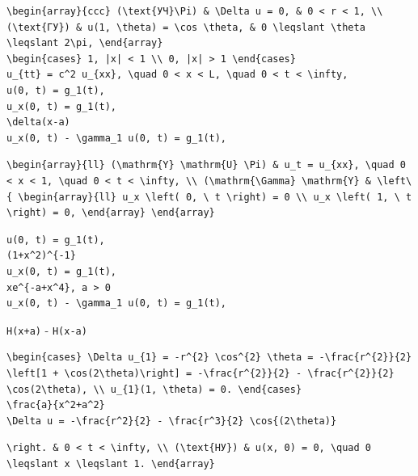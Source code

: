 \documentclass[
  ukrainian,
]{article}
\begin{document}
\begin{verbatim}
\begin{array}{ccc} (\text{УЧ}\Pi) & \Delta u = 0, & 0 < r < 1, \\ (\text{ГУ}) & u(1, \theta) = \cos \theta, & 0 \leqslant \theta \leqslant 2\pi, \end{array}
\begin{cases} 1, |x| < 1 \\ 0, |x| > 1 \end{cases}
u_{tt} = c^2 u_{xx}, \quad 0 < x < L, \quad 0 < t < \infty,
u(0, t) = g_1(t),
u_x(0, t) = g_1(t),
\delta(x-a)
u_x(0, t) - \gamma_1 u(0, t) = g_1(t),
\end{verbatim}

\begin{verbatim}
\begin{array}{ll} (\mathrm{Y} \mathrm{U} \Pi) & u_t = u_{xx}, \quad 0 < x < 1, \quad 0 < t < \infty, \\ (\mathrm{\Gamma} \mathrm{Y} & \left\{ \begin{array}{ll} u_x \left( 0, \ t \right) = 0 \\ u_x \left( 1, \ t \right) = 0, \end{array} \end{array}
\end{verbatim}

\begin{verbatim}
u(0, t) = g_1(t),
(1+x^2)^{-1}
u_x(0, t) = g_1(t),
xe^{-a+x^4}, a > 0
u_x(0, t) - \gamma_1 u(0, t) = g_1(t),
\end{verbatim}

\texttt{H(x+a)} - \texttt{H(x-a)}

\begin{verbatim}
\begin{cases} \Delta u_{1} = -r^{2} \cos^{2} \theta = -\frac{r^{2}}{2} \left[1 + \cos(2\theta)\right] = -\frac{r^{2}}{2} - \frac{r^{2}}{2} \cos(2\theta), \\ u_{1}(1, \theta) = 0. \end{cases}
\frac{a}{x^2+a^2}
\Delta u = -\frac{r^2}{2} - \frac{r^3}{2} \cos{(2\theta)}
\end{verbatim}

\begin{verbatim}
\right. & 0 < t < \infty, \\ (\text{НУ}) & u(x, 0) = 0, \quad 0 \leqslant x \leqslant 1. \end{array}
\end{verbatim}
\end{document}
